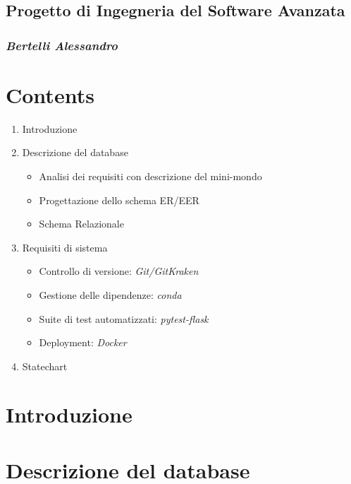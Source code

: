 \documentclass[a4paper, 12 pt]{article}
\begin{document}
	\begin{center}
		\section* {Progetto di Ingegneria del Software Avanzata}
		\subsubsection*{\textit{Bertelli Alessandro}}
	\end{center}
	\break

	\section* {Contents}
	\begin{enumerate}
		\item Introduzione
		\item Descrizione del database
		\begin{itemize}
			\item Analisi dei requisiti con descrizione del mini-mondo
			\item Progettazione dello schema ER/EER
			\item Schema Relazionale
		\end{itemize}
		\item Requisiti di sistema
		\begin{itemize}
			\item Controllo di versione: \textit{Git/GitKraken}
			\item Gestione delle dipendenze: \textit{conda}
			\item Suite di test automatizzati: \textit{pytest-flask}
			\item Deployment: \textit{Docker}
		\end{itemize}
		\item Statechart
	\end{enumerate}
	\break

	\section* {Introduzione}
	
	\break
	
	\section* {Descrizione del database}
\end{document}
